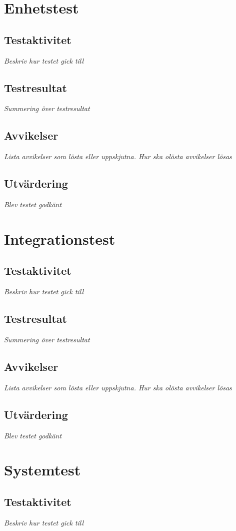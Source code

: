 \documentclass[a4paper,10pt]{article}
\begin{document}




\section{Enhetstest}
\subsection{Testaktivitet}
\emph{Beskriv hur testet gick till}
\subsection{Testresultat}
\emph{Summering över testresultat}
\subsection{Avvikelser}
\emph{Lista avvikelser som lösta eller uppskjutna. Hur ska olösta avvikelser lösas}
\subsection{Utvärdering}
\emph{Blev testet godkänt}
\section{Integrationstest}
\subsection{Testaktivitet}
\emph{Beskriv hur testet gick till}
\subsection{Testresultat}
\emph{Summering över testresultat}
\subsection{Avvikelser}
\emph{Lista avvikelser som lösta eller uppskjutna. Hur ska olösta avvikelser lösas}
\subsection{Utvärdering}
\emph{Blev testet godkänt}
\section{Systemtest}
\subsection{Testaktivitet}
\emph{Beskriv hur testet gick till}
\end{document}
